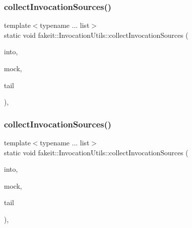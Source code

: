 \subsubsection{\texorpdfstring{collectInvocationSources()}{collectInvocationSources()}\hspace{0.1cm}{\footnotesize\ttfamily [7/18]}}
{\footnotesize\ttfamily template$<$typename ... list$>$ \\
static void fakeit\+::\+Invocation\+Utils\+::collect\+Invocation\+Sources (\begin{DoxyParamCaption}\item[{std\+::vector$<$ \mbox{\hyperlink{structfakeit_1_1ActualInvocationsSource}{Actual\+Invocations\+Source}} $\ast$ $>$ \&}]{into,  }\item[{const \mbox{\hyperlink{structfakeit_1_1ActualInvocationsSource}{Actual\+Invocations\+Source}} \&}]{mock,  }\item[{const list \&...}]{tail }\end{DoxyParamCaption})\hspace{0.3cm}{\ttfamily [inline]}, {\ttfamily [static]}}

\mbox{\label{structfakeit_1_1InvocationUtils_aa88116bb054d94ddc8a3a942f5fc3dd2}} 
\subsubsection{\texorpdfstring{collectInvocationSources()}{collectInvocationSources()}\hspace{0.1cm}{\footnotesize\ttfamily [8/18]}}
{\footnotesize\ttfamily template$<$typename ... list$>$ \\
static void fakeit\+::\+Invocation\+Utils\+::collect\+Invocation\+Sources (\begin{DoxyParamCaption}\item[{std\+::vector$<$ \mbox{\hyperlink{structfakeit_1_1ActualInvocationsSource}{Actual\+Invocations\+Source}} $\ast$ $>$ \&}]{into,  }\item[{const \mbox{\hyperlink{structfakeit_1_1ActualInvocationsSource}{Actual\+Invocations\+Source}} \&}]{mock,  }\item[{const list \&...}]{tail }\end{DoxyParamCaption})\hspace{0.3cm}{\ttfamily [inline]}, {\ttfamily [static]}}

